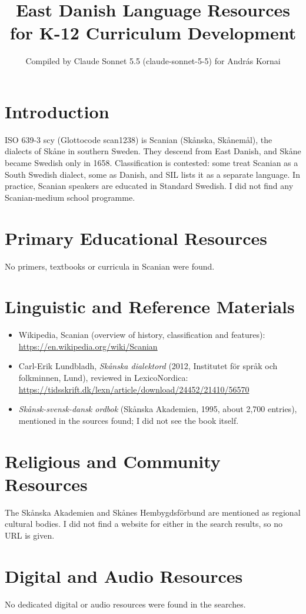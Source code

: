 \documentclass[12pt]{article}
\title{East Danish Language Resources for K-12 Curriculum Development}
\author{Compiled by Claude Sonnet 5.5 (claude-sonnet-5-5) for Andr\'as Kornai}
\date{}
\begin{document}
\maketitle

\section{Introduction}
ISO 639-3 scy (Glottocode scan1238) is Scanian (Skånska, Skånemål), the dialects of Skåne in southern Sweden. They descend from East Danish, and Skåne became Swedish only in 1658. Classification is contested: some treat Scanian as a South Swedish dialect, some as Danish, and SIL lists it as a separate language. In practice, Scanian speakers are educated in Standard Swedish. I did not find any Scanian-medium school programme.

\section{Primary Educational Resources}
No primers, textbooks or curricula in Scanian were found.

\section{Linguistic and Reference Materials}
\begin{itemize}
\item Wikipedia, Scanian (overview of history, classification and features): \url{https://en.wikipedia.org/wiki/Scanian}
\item Carl-Erik Lundbladh, \emph{Sk{\aa}nska dialektord} (2012, Institutet f{\"o}r spr{\aa}k och folkminnen, Lund), reviewed in LexicoNordica: \url{https://tidsskrift.dk/lexn/article/download/24452/21410/56570}
\item \emph{Sk{\aa}nsk-svensk-dansk ordbok} (Sk{\aa}nska Akademien, 1995, about 2,700 entries), mentioned in the sources found; I did not see the book itself.
\end{itemize}

\section{Religious and Community Resources}
The Sk{\aa}nska Akademien and Sk{\aa}nes Hembygdsf{\"o}rbund are mentioned as regional cultural bodies. I did not find a website for either in the search results, so no URL is given.

\section{Digital and Audio Resources}
No dedicated digital or audio resources were found in the searches.
\end{document}

